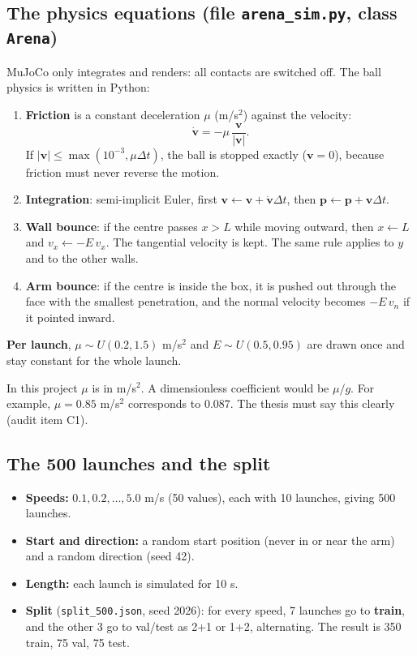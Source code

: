 \documentclass[11pt,a4paper]{article}
\newcommand{\vv}{\bm v}\newcommand{\pp}{\bm p}\newcommand{\uu}{\bm u}
\begin{document}
\subsection{The physics equations (file \texttt{arena\_sim.py}, class \texttt{Arena})}
MuJoCo only integrates and renders: all contacts are switched off. The ball physics is written in Python:
\begin{enumerate}
\item \textbf{Friction} is a constant deceleration $\mu$ (m/s$^2$) against the velocity:
\[ \dot{\vv} = -\mu\,\frac{\vv}{|\vv|}. \]
If $|\vv|\le\max(10^{-3},\mu\Delta t)$, the ball is stopped exactly ($\vv=0$), because friction must never reverse the motion.
\item \textbf{Integration}: semi-implicit Euler, first $\vv \leftarrow \vv + \dot{\vv}\Delta t$, then $\pp\leftarrow \pp+\vv\Delta t$.
\item \textbf{Wall bounce}: if the centre passes $x>L$ while moving outward, then $x\leftarrow L$ and $v_x\leftarrow -E\,v_x$.
  The tangential velocity is kept. The same rule applies to $y$ and to the other walls.
\item \textbf{Arm bounce}: if the centre is inside the box, it is pushed out through the face with the smallest
  penetration, and the normal velocity becomes $-E\,v_n$ if it pointed inward.
\end{enumerate}
\textbf{Per launch}, $\mu\sim U(0.2,1.5)$ m/s$^2$ and $E\sim U(0.5,0.95)$ are drawn once and stay constant for the
whole launch.

\begin{warn}
In this project $\mu$ is in m/s$^2$. A dimensionless coefficient would be $\mu/g$. For example, $\mu=0.85$ m/s$^2$
corresponds to $0.087$. The thesis must say this clearly (audit item C1).
\end{warn}

\subsection{The 500 launches and the split}
\begin{itemize}
\item \textbf{Speeds:} $0.1,0.2,\dots,5.0$ m/s (50 values), each with 10 launches, giving 500 launches.
\item \textbf{Start and direction:} a random start position (never in or near the arm) and a random direction (seed 42).
\item \textbf{Length:} each launch is simulated for 10 s.
\item \textbf{Split} (\texttt{split\_500.json}, seed 2026): for every speed, 7 launches go to \textbf{train}, and the other 3
  go to val/test as 2+1 or 1+2, alternating. The result is 350 train, 75 val, 75 test.
\end{itemize}
\end{document}
